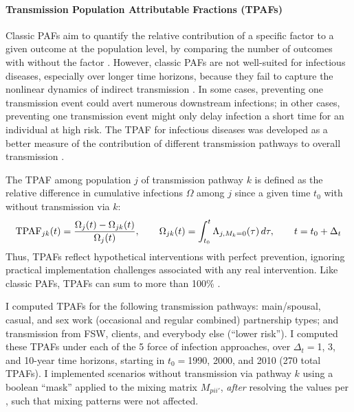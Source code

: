 \paragraph{Transmission Population Attributable Fractions (TPAFs)}
Classic PAFs aim to quantify
the relative contribution of a specific factor to a given outcome at the population level,
by comparing the number of outcomes with \vs without the factor \cite{Rockhill2011,Poole2015}.
However, classic PAFs are not well-suited for infectious diseases,
especially over longer time horizons, because
they fail to capture the nonlinear dynamics of indirect transmission \cite{Mishra2020}.
In some cases, preventing one transmission event could avert numerous downstream infections;
in other cases, preventing one transmission event might only
delay infection a short time for an individual at high risk.
The TPAF for infectious diseases was developed as a better measure of the contribution of
different transmission pathways to overall transmission \cite{Deering2008,Mishra2014,Mishra2016}.
\par
The TPAF among population $j$ of transmission pathway $k$ is defined as
the relative difference in cumulative infections $\Omega$ among $j$ since a given time $t_0$
with \vs without transmission via $k$:
\begin{equation}\label{eq:tpaf}
  \textup{TPAF}_{jk}(t) = \frac{\Omega_{j}(t) - \Omega_{jk} (t)}{\Omega_{j}(t)}
  ,\qquad
  \Omega_{jk}(t) = \int_{t_0}^{t} \Lambda_{j,M_k=0}(\tau)\,d\tau
  ,\qquad
  t = t_0 + \Delta_t
\end{equation}
Thus, TPAFs reflect hypothetical interventions with perfect prevention,
ignoring practical implementation challenges associated with any real intervention.
Like classic PAFs, TPAFs can sum to more than 100\% \cite{Rowe2004,Mishra2021}.
\par
I computed TPAFs for the following transmission pathways:
main/spousal, casual, and sex work (occasional and regular combined) partnership types; and
transmission from FSW, clients, and everybody else (``lower risk'').
I computed these TPAFs under each of the 5 force of infection approaches,
over $\Delta_t = {}$1, 3, and 10-year time horizons,
starting in $t_0 = {}$1990, 2000, and 2010 (270 total TPAFs).
I implemented scenarios without transmission via pathway $k$
using a boolean ``mask'' applied to the mixing matrix $M_{pii'}$,
\emph{after} resolving the values per ,
such that mixing patterns were not affected.

